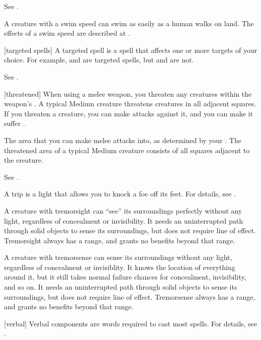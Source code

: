  See .

 A creature with a swim speed can swim as easily as a human walks on land.
The effects of a swim speed are described at .

[targeted spells] A targeted spell is a spell that affects one or more targets of your choice.
For example,  and  are targeted spells, but  and  are not.

 See .

[threatened] When using a melee weapon, you threaten any creatures within the weapon's .
A typical Medium creature threatens creatures in all adjacent squares.
If you threaten a creature, you can make  attacks against it, and you can make it suffer .

 The area that you can make melee attacks into, as determined by your .
The threatened area of a typical Medium creature consists of all squares adjacent to the creature.

 See .

 A trip is a light  that allows you to knock a foe off its feet.
For details, see .

 A creature with tremorsight can ``see'' its surroundings perfectly without any light, regardless of concealment or invisibility.
It needs an uninterrupted path through solid objects to sense its surroundings, but does not require line of effect.
Tremorsight always has a range, and grants no benefits beyond that range.

 A creature with tremorsense can sense its surroundings without any light, regardless of concealment or invisiblity.
It knows the location of everything around it, but it still takes normal failure chances for concealment, invisibility, and so on.
It needs an uninterrupted path through solid objects to sense its surroundings, but does not require line of effect.
Tremorsense always has a range, and grants no benefits beyond that range.

[verbal] Verbal components are words required to cast most spells.
For details, see .

